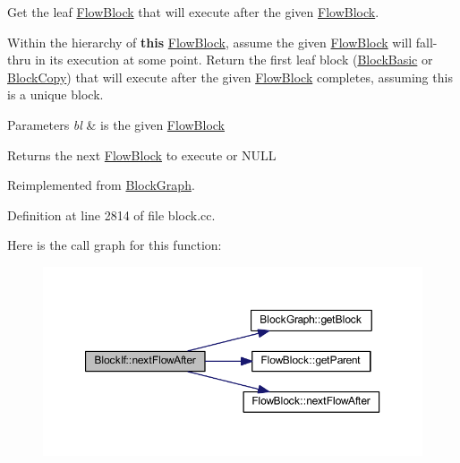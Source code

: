 Get the leaf \mbox{\hyperlink{class_flow_block}{Flow\+Block}} that will execute after the given \mbox{\hyperlink{class_flow_block}{Flow\+Block}}. 

Within the hierarchy of {\bfseries{this}} \mbox{\hyperlink{class_flow_block}{Flow\+Block}}, assume the given \mbox{\hyperlink{class_flow_block}{Flow\+Block}} will fall-\/thru in its execution at some point. Return the first leaf block (\mbox{\hyperlink{class_block_basic}{Block\+Basic}} or \mbox{\hyperlink{class_block_copy}{Block\+Copy}}) that will execute after the given \mbox{\hyperlink{class_flow_block}{Flow\+Block}} completes, assuming this is a unique block. 
\begin{DoxyParams}{Parameters}
{\em bl} & is the given \mbox{\hyperlink{class_flow_block}{Flow\+Block}} \\
\hline
\end{DoxyParams}
\begin{DoxyReturn}{Returns}
the next \mbox{\hyperlink{class_flow_block}{Flow\+Block}} to execute or N\+U\+LL 
\end{DoxyReturn}


Reimplemented from \mbox{\hyperlink{class_block_graph_aba0d42cf572bdcf2bca44d22fad971f6}{Block\+Graph}}.



Definition at line 2814 of file block.\+cc.

Here is the call graph for this function\+:
\nopagebreak
\begin{figure}[H]
\begin{center}
\leavevmode
\includegraphics[width=350pt]{class_block_if_adbc4cd5fb6cad60aa333c12532b55e1f_cgraph}
\end{center}
\end{figure}
\mbox{\label{class_block_if_a41fef7fb5278f859257b6e560c0a08dd}} 

